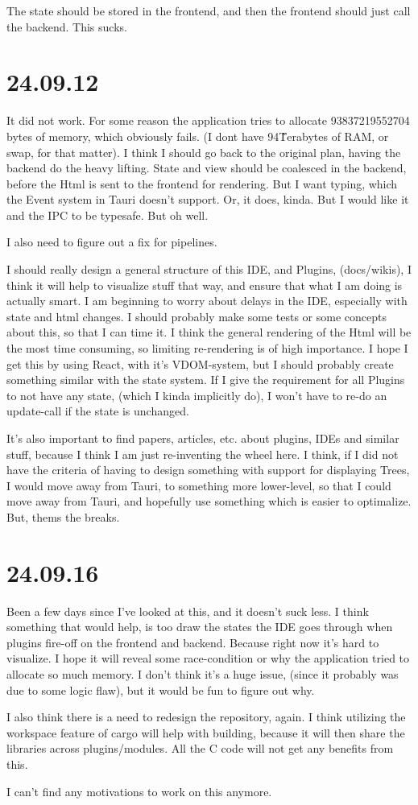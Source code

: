 The state should be stored in the frontend, and then the frontend should just call the backend.
This sucks.


\section{24.09.12}

It did not work. For some reason the application tries to allocate 93837219552704 bytes of memory,
which obviously fails. (I dont have 94\~ Terabytes of RAM, or swap, for that matter). I think I should
go back to the original plan, having the backend do the heavy lifting. State and view should be
coalesced in the backend, before the Html is sent to the frontend for rendering. But I want typing,
which the Event system in Tauri doesn't support. Or, it does, kinda. But I would like it and the IPC
to be typesafe. But oh well.

I also need to figure out a fix for pipelines.

I should really design a general structure of this IDE, and Plugins, (docs/wikis), I think it will help
to visualize stuff that way, and ensure that what I am doing is actually smart. I am beginning to worry
about delays in the IDE, especially with state and html changes. I should probably make some tests or
some concepts about this, so that I can time it. I think the general rendering of the Html will be the
most time consuming, so limiting re-rendering is of high importance. I hope I get this by using React,
with it's VDOM-system, but I should probably create something similar with the state system. If I give
the requirement for all Plugins to not have any state, (which I kinda implicitly do), I won't have to
re-do an update-call if the state is unchanged.

It's also important to find papers, articles, etc. about plugins, IDEs and similar stuff, because I think
I am just re-inventing the wheel here. I think, if I did not have the criteria of having to design
something with support for displaying Trees, I would move away from Tauri, to something more lower-level,
so that I could move away from Tauri, and hopefully use something which is easier to optimalize. But, thems
the breaks.


\section{24.09.16}

Been a few days since I've looked at this, and it doesn't suck less. I think something that would help, is
too draw the states the IDE goes through when plugins fire-off on the frontend and backend. Because right
now it's hard to visualize. I hope it will reveal some race-condition or why the application tried to
allocate so much memory. I don't think it's a huge issue, (since it probably was due to some logic flaw),
but it would be fun to figure out why.

I also think there is a need to redesign the repository, again. I think utilizing the workspace feature of
cargo will help with building, because it will then share the libraries across plugins/modules. All the C
code will not get any benefits from this.

I can't find any motivations to work on this anymore.
